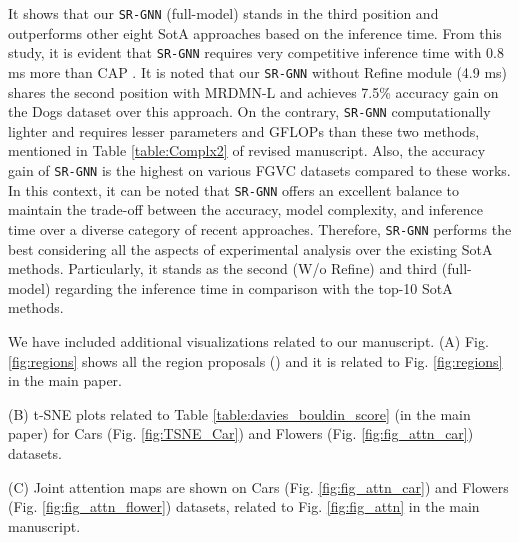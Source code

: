 \documentclass[journal]{IEEEtran}
\begin{document}
It shows that our \texttt{SR-GNN} (full-model) stands in the third position and outperforms other eight SotA approaches based on the inference time. From this study, it is evident that \texttt{SR-GNN} requires very competitive inference time with 0.8 ms more than CAP \cite{behera2021context}. It is noted that our \texttt{SR-GNN} without Refine module (4.9 ms) shares the second position with MRDMN-L \cite{xu2021multiresolution} and achieves 7.5\% accuracy gain on the Dogs dataset over this approach. On the contrary, \texttt{SR-GNN} computationally lighter and requires lesser parameters and GFLOPs than these two methods, mentioned in Table \ref{table:Complx2}  of revised manuscript. Also, the accuracy gain of \texttt{SR-GNN} is the highest on various FGVC datasets compared to these works. In this context, it can be noted that \texttt{SR-GNN} offers an excellent balance to maintain the trade-off between the accuracy, model complexity, and inference time over a diverse category of recent approaches. Therefore, \texttt{SR-GNN} performs the best considering all the aspects of experimental analysis over the existing SotA methods. Particularly, it stands as the second (W/o Refine) and third (full-model) regarding the inference time in comparison with the top-10 SotA methods.   

We have included additional visualizations related to our manuscript. 
(A) Fig. \ref{fig:regions} shows all the region proposals () and it is related to Fig. \ref{fig:regions} in the main paper.

(B)  t-SNE plots related to Table \ref{table:davies_bouldin_score} (in the main paper) for Cars (Fig. \ref{fig:TSNE_Car}) and Flowers (Fig. \ref{fig:fig_attn_car}) datasets.

(C) Joint attention maps are shown on Cars (Fig. \ref{fig:fig_attn_car}) and Flowers (Fig. \ref{fig:fig_attn_flower}) datasets, related to Fig.   \ref{fig:fig_attn} in the main manuscript. \\
\end{document}
